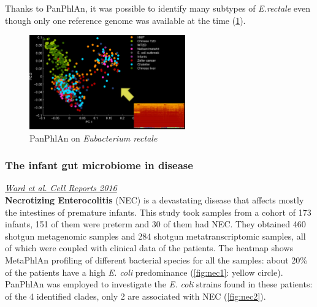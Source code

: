 Thanks to PanPhlAn, it was possible to identify many subtypes of \emph{E.rectale} even though only one reference genome was available at the time (\ref{fig:Erec}).

\begin{figure}[!h]
\centering
\includegraphics[width=0.6\textwidth]{Erectale.png}
\caption{\label{fig:Erec} PanPhlAn on \emph{Eubacterium rectale}}
\end{figure}

\subsubsection{The infant gut microbiome in disease}

\href{https://www.cell.com/cell-reports/pdf/S2211-1247(16)30256-X.pdf}{\emph{Ward et al. Cell Reports 2016}} \\

\textbf{Necrotizing Enterocolitis} (NEC) is a devastating disease that affects mostly the intestines of premature infants. This study took samples from a cohort of 173 infants, 151 of them were preterm and 30 of them had NEC. They obtained 460 shotgun metagenomic samples and 284 shotgun metatranscriptomic samples, all of which were coupled with clinical data of the patients. The heatmap shows MetaPhlAn profiling of different bacterial species for all the samples: about 20\% of the patients have a high \emph{E. coli} predominance (\ref{fig:nec1}: yellow circle). PanPhlAn was employed to investigate the \emph{E. coli} strains found in these patients: of the 4 identified clades, only 2 are associated with NEC (\ref{fig:nec2}).


